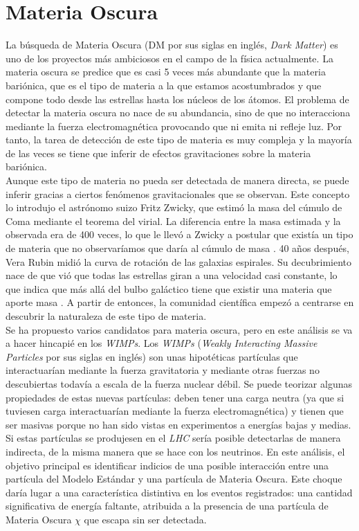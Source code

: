 \section{Materia Oscura}

La búsqueda de Materia Oscura (DM por sus siglas en inglés, \textit{Dark Matter}) es uno de los proyectos más ambiciosos en el campo de la física actualmente. La materia oscura se predice que es casi 5 veces más abundante que la materia bariónica, que es el tipo de materia a la que estamos acostumbrados y que compone todo desde las estrellas hasta los núcleos de los átomos. El problema de detectar la materia oscura no nace de su abundancia, sino de que no interacciona mediante la fuerza electromagnética provocando que ni emita ni refleje luz. Por tanto, la tarea de detección de este tipo de materia es muy compleja y la mayoría de las veces se tiene que inferir de efectos gravitaciones sobre la materia bariónica.\\

Aunque este tipo de materia no pueda ser detectada de manera directa, se puede inferir gracias a ciertos fenómenos gravitacionales que se observan. Este concepto lo introdujo el astrónomo suizo Fritz Zwicky, que estimó la masa del cúmulo de Coma mediante el teorema del virial. La diferencia entre la masa estimada y la observada era de 400 veces, lo que le llevó a Zwicky a postular que existía un tipo de materia que no observaríamos que daría al cúmulo de masa \cite{Zwicky}. 40 años después, Vera Rubin midió la curva de rotación de las galaxias espirales. Su decubrimiento nace de que vió que todas las estrellas giran a una velocidad casi constante, lo que indica que más allá del bulbo galáctico tiene que existir una materia que aporte masa \cite{rubin}. A partir de entonces, la comunidad científica empezó a centrarse en descubrir la naturaleza de este tipo de materia.\\

Se ha propuesto varios candidatos para materia oscura, pero en este análisis se va a hacer hincapié en los \textit{WIMPs}. Los \textit{WIMPs} (\textit{Weakly Interacting Massive Particles} por sus siglas en inglés) son unas hipotéticas partículas que interactuarían mediante la fuerza gravitatoria y mediante otras fuerzas no descubiertas todavía a escala de la fuerza nuclear débil. Se puede teorizar algunas propiedades de estas nuevas partículas: deben tener una carga neutra (ya que si tuviesen carga interactuarían mediante la fuerza electromagnética) y tienen que ser masivas porque no han sido vistas en experimentos a energías bajas y medias.  Si estas partículas se produjesen en el \textit{LHC} sería posible detectarlas de manera indirecta, de la misma manera que se hace con los neutrinos. En este análisis, el objetivo principal es identificar indicios de una posible interacción entre una partícula del Modelo Estándar y una partícula de Materia Oscura. Este choque daría lugar a una característica distintiva en los eventos registrados: una cantidad significativa de energía faltante, atribuida a la presencia de una partícula de Materia Oscura $\chi$ que escapa sin ser detectada.\\

